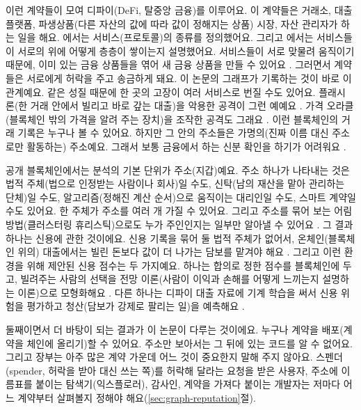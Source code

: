 이런 계약들이 모여 디파이(DeFi, 탈중앙 금융)를 이루어요. 이 계약들은 거래소, 대출 플랫폼, 파생상품(다른 자산의 값에 따라 값이 정해지는 상품) 시장, 자산 관리자가 하는 일을 해요. \textcite{werner2022sok}에서는 서비스(프로토콜)의 종류를 정의했어요. 그리고 \textcite{schar2021defi}에서는 서비스들이 서로의 위에 어떻게 층층이 쌓이는지 설명했어요. 서비스들이 서로 맞물려 움직이기 때문에, 이미 있는 금융 상품들을 엮어 새 금융 상품을 만들 수 있어요 \parencite{kitzler2023defi}. 그러면서 계약들은 서로에게 허락을 주고 송금하게 돼요. 이 논문의 그래프가 기록하는 것이 바로 이 관계예요. 같은 성질 때문에 한 곳의 고장이 여러 서비스로 번질 수도 있어요. 플래시 론(한 거래 안에서 빌리고 바로 갚는 대출)을 악용한 공격이 그런 예예요 \parencite{qin2021flashloans}. 가격 오라클(블록체인 밖의 가격을 알려 주는 장치)을 조작한 공격도 그래요 \parencite{zhou2023sok}. 이런 블록체인의 거래 기록은 누구나 볼 수 있어요. 하지만 그 안의 주소들은 가명의(진짜 이름 대신 주소로만 활동하는) 주소예요. 그래서 보통 금융에서 하는 신분 확인을 하기가 어려워요 \parencite{lin2025riskprop}.


공개 블록체인에서는 분석의 기본 단위가 주소(지갑)예요. 주소 하나가 나타내는 것은 법적 주체(법으로 인정받는 사람이나 회사)일 수도, 신탁(남의 재산을 맡아 관리하는 단체)일 수도, 알고리즘(정해진 계산 순서)으로 움직이는 대리인일 수도, 스마트 계약일 수도 있어요. 한 주체가 주소를 여러 개 가질 수 있어요. 그리고 주소를 묶어 보는 어림 방법(클러스터링 휴리스틱)으로도 누가 주인인지는 일부만 알아낼 수 있어요 \parencite{victor2020clustering}. 그 결과 하나는 신용에 관한 것이에요. 신용 기록을 묶어 둘 법적 주체가 없어서, 온체인(블록체인 위의) 대출에서는 빌린 돈보다 값이 더 나가는 담보를 맡겨야 해요 \parencite{bartoletti2021lending}. 그리고 이런 환경을 위해 제안된 신용 점수는 두 가지예요. 하나는 합의로 정한 점수를 블록체인에 두고, 빌려주는 사람의 선택을 전망 이론(사람이 이익과 손해를 어떻게 느끼는지 설명하는 이론)으로 모형화해요 \parencite{hassija2020lending}. 다른 하나는 디파이 대출 자료에 기계 학습을 써서 신용 위험을 평가하고 청산(담보가 강제로 팔리는 일)을 예측해요 \parencite{palaiokrassas2024credit}.

둘째이면서 더 바탕이 되는 결과가 이 논문이 다루는 것이에요. 누구나 계약을 배포(계약을 체인에 올리기)할 수 있어요. 주소만 보아서는 그 뒤에 있는 코드를 알 수 없어요. 그리고 장부는 아주 많은 계약 가운데 어느 것이 중요한지 말해 주지 않아요. 스펜더(spender, 허락을 받아 대신 쓰는 쪽)를 허락해 달라는 요청을 받은 사용자, 주소에 이름표를 붙이는 탐색기(익스플로러), 감사인, 계약을 가져다 붙이는 개발자는 저마다 어느 계약부터 살펴볼지 정해야 해요(\ref{sec:graph-reputation}절).

